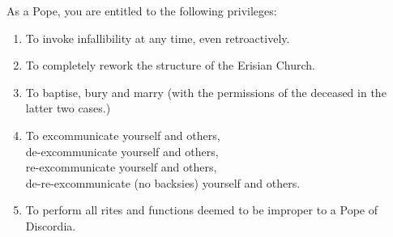 \documentclass[11pt,a4paper]{memoir}
\begin{document}
\noindent
\tiny{
As a Pope, you are entitled to the following privileges:
\begin{enumerate}
\item To invoke infallibility at any time, even retroactively.
\item To completely rework the structure of the Erisian Church.
\item To baptise, bury and marry (with the permissions of the deceased in the latter two cases.)
\item To excommunicate yourself and others,\\
de-excommunicate yourself and others,\\
re-excommunicate yourself and others,\\
de-re-excommunicate (no backsies) yourself and others.
\item To perform all rites and functions deemed to be improper to a Pope of Discordia.
\end{enumerate}
}
\end{document}
